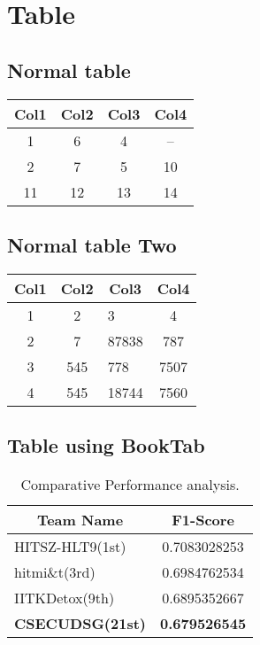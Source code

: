 \documentclass{article}
\begin{document}
\section{Table}
\label{ref:table}
\subsection{Normal table}
\begin{table}[!h]
\centering 
\begin{tabular}{|c|c|c|c|}
\hline
\textbf{Col1} & \textbf{Col2} & \textbf{Col3} & \textbf{Col4}\\
\hline
1 & 6 & 4 & --\\
\hline
2 & 7 & 5 & 10\\
\hline
11 & 12 & 13 & 14\\
\hline
\end{tabular}
\end{table}

\subsection{Normal table Two}
\label{ref:table}
\begin{table}[!h]
\centering
\begin{tabular}{|c|c|m{4cm}|c|}
\hline
\textbf{Col1} & \textbf{Col2} &\multicolumn{1}{c|}{\textbf{Col3}} & \textbf{Col4}\\
\hline
1 & 2 & 3 & 4\\
2 & 7 & 87838 & 787\\
3 & 545 & 778 & 7507\\
4 & 545 & 18744 & 7560\\
\hline
\end{tabular}
\end{table}

\subsection{Table using BookTab}
\label{ref:table}
\begin{table}[H]
\centering
\begin{tabular}{lc}
\toprule
\multicolumn{1}{c}{\textbf{Team Name}} & \textbf{F1-Score}\\
\midrule
HITSZ-HLT9(1st)& 0.7083028253\\
hitmi\&t(3rd)  & 0.6984762534\\
IITKDetox(9th) & 0.6895352667\\
\textbf{CSECUDSG(21st)} & \textbf{0.679526545}\\
\bottomrule
\end{tabular}
\caption{Comparative Performance analysis.}
\end{table}
\end{document}
